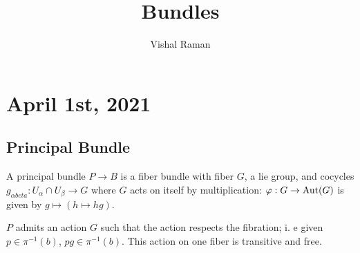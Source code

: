 \documentclass[11pt]{scrartcl}
\let \phi \varphi
\newcommand{\<}{\langle}
\renewcommand{\>}{\rangle}
\begin{document}
\title{Bundles}
\author{Vishal Raman}

\section{April 1st, 2021}
\subsection{Principal Bundle}
\begin{definition} A principal bundle $P \to B$ is a fiber bundle with fiber $G$, a lie group, and cocycles $g_{\alpha beta}: U_\alpha \cap U_\beta \to G$ where $G$ acts on itself by multiplication: $\phi: G \to \Aut(G)$ is given by $g \mapsto (h \mapsto hg)$.
\end{definition}
 $P$ admits an action $G$ such that the action respects the fibration; i. e given $p \in \pi^{-1}(b)$, $pg \in \pi^{-1}(b)$.  This action on one fiber is transitive and free.  
 
\end{document}
